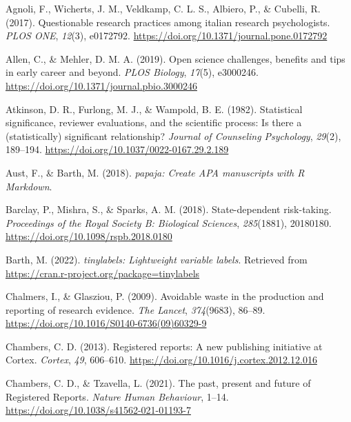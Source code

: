 \documentclass[
  ,man,mask,floatsintext]{apa6}
\newlength{\cslhangindent}
\newlength{\cslentryspacingunit} %
\newenvironment{CSLReferences}[2] %
 {%
  \setlength{\parindent}{0pt}
  \ifodd #1
  \let\oldpar\par
  \def\par{\hangindent=\cslhangindent\oldpar}
  \fi
  \setlength{\parskip}{#2\cslentryspacingunit}
 }%
 {}
\begin{document}
\hypertarget{refs}{}
\begin{CSLReferences}{1}{0}
\leavevmode{}%
Agnoli, F., Wicherts, J. M., Veldkamp, C. L. S., Albiero, P., \& Cubelli, R. (2017). Questionable research practices among italian research psychologists. \emph{PLOS ONE}, \emph{12}(3), e0172792. \url{https://doi.org/10.1371/journal.pone.0172792}

\leavevmode{}%
Allen, C., \& Mehler, D. M. A. (2019). Open science challenges, benefits and tips in early career and beyond. \emph{PLOS Biology}, \emph{17}(5), e3000246. \url{https://doi.org/10.1371/journal.pbio.3000246}

\leavevmode{}%
Atkinson, D. R., Furlong, M. J., \& Wampold, B. E. (1982). Statistical significance, reviewer evaluations, and the scientific process: {Is} there a (statistically) significant relationship? \emph{Journal of Counseling Psychology}, \emph{29}(2), 189--194. \url{https://doi.org/10.1037/0022-0167.29.2.189}

\leavevmode{}%
Aust, F., \& Barth, M. (2018). \emph{{papaja}: {Create APA} manuscripts with {R Markdown}}.

\leavevmode{}%
Barclay, P., Mishra, S., \& Sparks, A. M. (2018). State-dependent risk-taking. \emph{Proceedings of the Royal Society B: Biological Sciences}, \emph{285}(1881), 20180180. \url{https://doi.org/10.1098/rspb.2018.0180}

\leavevmode{}%
Barth, M. (2022). \emph{{tinylabels}: Lightweight variable labels}. Retrieved from \url{https://cran.r-project.org/package=tinylabels}

\leavevmode{}%
Chalmers, I., \& Glasziou, P. (2009). Avoidable waste in the production and reporting of research evidence. \emph{The Lancet}, \emph{374}(9683), 86--89. \url{https://doi.org/10.1016/S0140-6736(09)60329-9}

\leavevmode{}%
Chambers, C. D. (2013). Registered reports: {A} new publishing initiative at {Cortex}. \emph{Cortex}, \emph{49}, 606--610. \url{https://doi.org/10.1016/j.cortex.2012.12.016}

\leavevmode{}%
Chambers, C. D., \& Tzavella, L. (2021). The past, present and future of {Registered Reports}. \emph{Nature Human Behaviour}, 1--14. \url{https://doi.org/10.1038/s41562-021-01193-7}


\end{CSLReferences}
\end{document}
